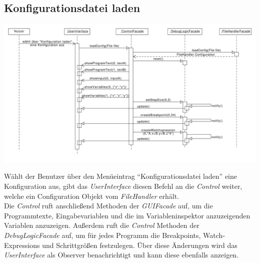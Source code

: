 \documentclass[parskip=full]{scrartcl}
\begin{document}
\subsection{Konfigurationsdatei laden}
\begin{center}
\includegraphics[width=1.0\textwidth]{diagrammIdeenUmlet/SequenceDiagrams/seq_loadConfigPDF.pdf}
\end{center}
Wählt der Benutzer über den Menüeintrag \enquote{Konfigurationsdatei laden} eine Konfiguration aus, gibt das \textit{UserInterface} diesen Befehl an die \textit{Control} weiter, welche ein Configuration Objekt vom \textit{FileHandler} erhält. \\
Die \textit{Control} ruft anschließend Methoden der \textit{GUIFacade} auf, um die Programmtexte, Eingabevariablen und die im Variableninspektor anzuzeigenden Variablen anzuzeigen. 
Außerdem ruft die \textit{Control} Methoden der \textit{DebugLogicFacade} auf, um für jedes Programm die Breakpoints, Watch-Expressions und Schrittgrößen festzulegen. 
Über diese Änderungen wird das \textit{UserInterface} als Observer benachrichtigt und kann diese ebenfalls anzeigen.

\newpage
\end{document}
